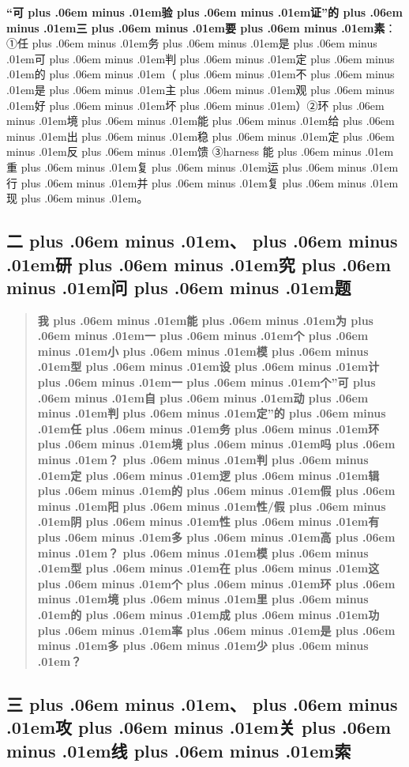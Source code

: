 \documentclass[
]{article}
\def\zh#1{{\zhfont #1}}
\def\sym#1{{\symfont #1}}
\def\zhglue{\hskip0pt plus .06em minus .01em}
\begin{document}
\textbf{``\zh{可\zhglue 验\zhglue 证}''\zh{的\zhglue 三\zhglue 要\zhglue 素}}\zh{：}\sym{①}\zh{任\zhglue 务\zhglue 是\zhglue 可\zhglue 判\zhglue 定\zhglue 的\zhglue （\zhglue 不\zhglue 是\zhglue 主\zhglue 观\zhglue 好\zhglue 坏\zhglue ）}\sym{②}\zh{环\zhglue 境\zhglue 能\zhglue 给\zhglue 出\zhglue 稳\zhglue 定\zhglue 反\zhglue 馈} \sym{③}harness \zh{能\zhglue 重\zhglue 复\zhglue 运\zhglue 行\zhglue 并\zhglue 复\zhglue 现\zhglue 。}

\subsection{\zh{二\zhglue 、\zhglue 研\zhglue 究\zhglue 问\zhglue 题}}\label{ux4e8cux7814ux7a76ux95eeux9898}

\begin{quote}
\textbf{\zh{我\zhglue 能\zhglue 为\zhglue 一\zhglue 个\zhglue 小\zhglue 模\zhglue 型\zhglue 设\zhglue 计\zhglue 一\zhglue 个}''\zh{可\zhglue 自\zhglue 动\zhglue 判\zhglue 定}''\zh{的\zhglue 任\zhglue 务\zhglue 环\zhglue 境\zhglue 吗\zhglue ？\zhglue 判\zhglue 定\zhglue 逻\zhglue 辑\zhglue 的\zhglue 假\zhglue 阳\zhglue 性}/\zh{假\zhglue 阴\zhglue 性\zhglue 有\zhglue 多\zhglue 高\zhglue ？\zhglue 模\zhglue 型\zhglue 在\zhglue 这\zhglue 个\zhglue 环\zhglue 境\zhglue 里\zhglue 的\zhglue 成\zhglue 功\zhglue 率\zhglue 是\zhglue 多\zhglue 少\zhglue ？}}
\end{quote}

\subsection{\zh{三\zhglue 、\zhglue 攻\zhglue 关\zhglue 线\zhglue 索}}\label{ux4e09ux653bux5173ux7ebfux7d22}
\end{document}
